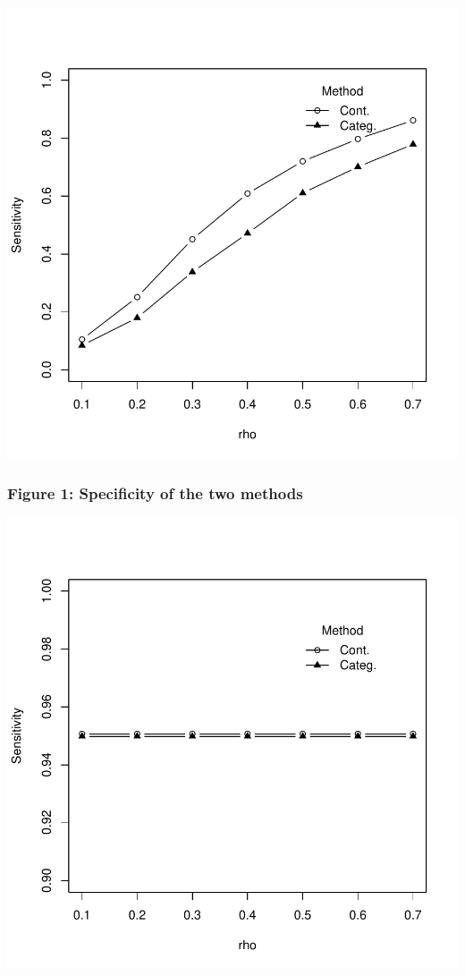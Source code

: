\documentclass{article}
\begin{document}
\includegraphics{accuracy-dd}

\subsubsection*{Figure 1: Specificity of the two methods}

\includegraphics{accuracy-ee}
\end{document}
